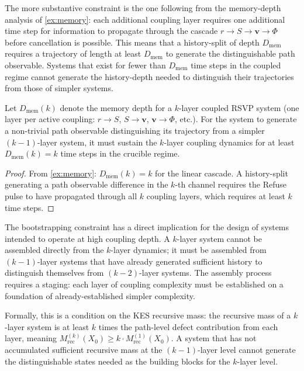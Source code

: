 \documentclass[12pt, oneside]{memoir}
\newcommand{\bv}{\mathbf{v}}
\begin{document}
The more substantive constraint is the one following from the memory-depth analysis of
\cref{ex:memory}: each additional coupling layer requires one additional time step for
information to propagate through the cascade $r \to S \to \bv \to \Phi$ before
cancellation is possible.  This means that a history-split of depth $D_{\mathrm{mem}}$
requires a trajectory of length at least $D_{\mathrm{mem}}$ to generate the
distinguishable path observable.  Systems that exist for fewer than $D_{\mathrm{mem}}$
time steps in the coupled regime cannot generate the history-depth needed to distinguish
their trajectories from those of simpler systems.

\begin{proposition}
\label{prop:bootstrap}
Let $D_{\mathrm{mem}}(k)$ denote the memory depth for a $k$-layer coupled RSVP system
(one layer per active coupling: $r \to S$, $S \to \bv$, $\bv \to \Phi$, etc.).  For the
system to generate a non-trivial path observable distinguishing its trajectory from a
simpler $(k-1)$-layer system, it must sustain the $k$-layer coupling dynamics for at
least $D_{\mathrm{mem}}(k) = k$ time steps in the crucible regime.
\end{proposition}

\begin{proof}
From \cref{ex:memory}: $D_{\mathrm{mem}}(k) = k$ for the linear cascade.  A history-split
generating a path observable difference in the $k$-th channel requires the Refuse pulse
to have propagated through all $k$ coupling layers, which requires at least $k$ time
steps.
\end{proof}

The bootstrapping constraint has a direct implication for the design of systems intended
to operate at high coupling depth.  A $k$-layer system cannot be assembled directly from
the $k$-layer dynamics; it must be assembled from $(k-1)$-layer systems that have
already generated sufficient history to distinguish themselves from $(k-2)$-layer systems.
The assembly process requires a staging: each layer of coupling complexity must be
established on a foundation of already-established simpler complexity.

Formally, this is a condition on the KES recursive mass: the recursive mass of a
$k$-layer system is at least $k$ times the path-level defect contribution from each
layer, meaning $M_{\mathrm{rec}}^{(k)}(X_0) \geq k \cdot M_{\mathrm{rec}}^{(1)}(X_0)$.
A system that has not accumulated sufficient recursive mass at the $(k-1)$-layer level
cannot generate the distinguishable states needed as the building blocks for the
$k$-layer level.
\end{document}
